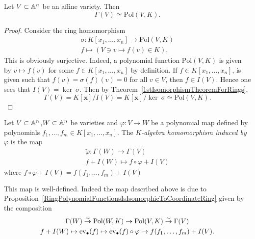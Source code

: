 \begin{proposition}\label{RingPolynomialFunctionsIsIsomorphicToCoordinateRing}
    Let $V\subset \mathbb{A}^n$ be an affine variety. Then 
    $$\Gamma(V) \simeq \mathrm{Pol}(V,K).$$
\end{proposition}
\begin{proof}
    Consider the ring homomorphism
    \begin{gather*}
        \sigma : K[x_1,\dots,x_n] \rightarrow \text{Pol}(V,K)\\
        f \mapsto (V\ni v\mapsto f(v)\in K), 
    \end{gather*}
    This is obviously surjective. Indeed, a polynomial function $\text{Pol}(V,K)$ is given by $v\mapsto f(v)$ for some $f\in K[x_1,\dots,x_n]$ by definition. If $f\in K[x_1,\dots,x_n]$, is given such that $f(v)=\sigma(f)(v)= 0$ for all $v\in V$, then $f\in I(V)$. Hence one sees that $I(V) = \ker \ \sigma$. Then by Theorem~\ref{1stIsomorphismTheoremForRings},
    $$\Gamma(V) = K[\mathbf{x}]/I(V) = K[\mathbf{x}]/\ker\ \sigma \simeq \text{Pol}(V,K).$$
\end{proof}
\begin{definition}
    Let $V\subset \mathbb{A}^n$,$W\subset \mathbb{A}^n$ be varieties and $\varphi: V\rightarrow W$ be a polynomial map defined by polynomials $f_1,\dots,f_m\in K[x_1,\dots,x_n]$. The \textit{$K$-algebra homomorphism induced by $\varphi$} is the map 
    \begin{gather*}
        \widetilde{\varphi} : \Gamma(W)\rightarrow \Gamma(V)\\
        f + I(W) \mapsto f \circ \varphi + I(V)
    \end{gather*}
    where $f\circ \varphi + I(V) = f(f_1,\dots,f_m) + I(V)$
\end{definition}
\begin{remark}
    This map is well-defined. Indeed the map described above is due to Proposition~\ref{RingPolynomialFunctionsIsIsomorphicToCoordinateRing} given by the composition
    \begin{gather*}
    \Gamma(W) \overset{\sim}{\rightarrow} \mathrm{Pol}(W,K) \rightarrow \mathrm{Pol}(V,K) \overset{\sim}{\rightarrow} \Gamma(V)\\
    f + I(W) \mapsto \mathrm{ev}_\bullet(f) \mapsto \mathrm{ev}_\bullet(f)\circ \varphi \mapsto f(f_1,\dots,f_m)+I(V).
    \end{gather*}
\end{remark}

